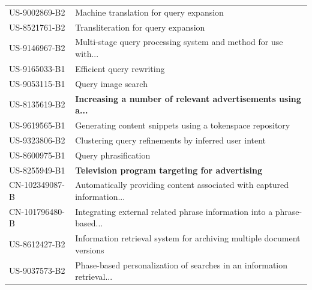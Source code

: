 \begin{table}[h]
\begin{tabular}{ll}
US-9002869-B2    & Machine translation for query expansion                                                                         \\
US-8521761-B2    & Transliteration for query expansion                                                                             \\
US-9146967-B2    & Multi-stage query processing system and method for use with...                               \\
US-9165033-B1    & Efficient query rewriting                                                                                       \\
US-9053115-B1    & Query image search                                                                                              \\
US-8135619-B2    & \textbf{Increasing a number of relevant advertisements using a...}                                            \\
US-9619565-B1    & Generating content snippets using a tokenspace repository                                                       \\
US-9323806-B2    & Clustering query refinements by inferred user intent                                                            \\
US-8600975-B1    & Query phrasification                                                                                            \\
US-8255949-B1    & \textbf{Television program targeting for advertising}                                                                    \\
CN-102349087-B   & Automatically providing content associated with captured information... \\
CN-101796480-B   & Integrating external related phrase information into a phrase-based...       \\
US-8612427-B2    & Information retrieval system for archiving multiple document versions                                           \\
US-9037573-B2    & Phase-based personalization of searches in an information retrieval...                                      \\
\end{tabular}
\end{table}

